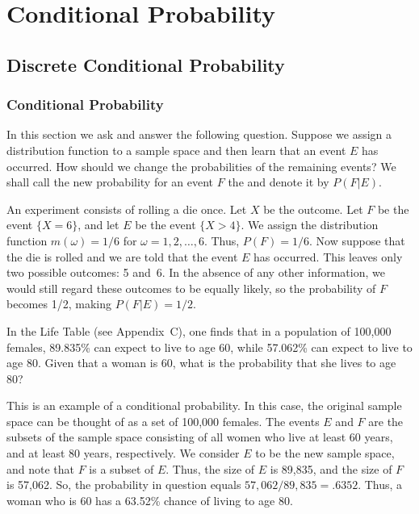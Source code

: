 
\chapter{Conditional Probability}\label{chp 4}  

\section{Discrete Conditional Probability}\label{sec 4.1} 

\subsection*{Conditional Probability}
\par
In this section we ask and answer the following question.  Suppose we assign a
distribution function to a sample space and then learn that an event $E$ has
occurred.  How should we change the probabilities of the remaining events?  We
shall call the new probability for an event $F$ the  and
denote it by
$P(F|E)$.

\begin{example}\label{exam 4.1}
An experiment consists of rolling a die once.  Let $X$ be the outcome.  Let $F$ be the event
$\{X = 6\}$, and  let $E$ be the event $\{X > 4\}$.  We assign the
distribution function
$m(\omega) = 1/6$ for $\omega = 1, 2, \ldots , 6$.  Thus, $P(F) =
1/6$.  Now suppose that the die is rolled and we are told that the event $E$ has occurred.  
This leaves only two possible outcomes: 5 and~6.  In the absence of any other 
information, we would still regard these outcomes to be equally likely, so the 
probability of $F$ becomes 1/2, making $P(F|E) = 1/2$.
\end{example}

\begin{example}\label{exam 4.1.5}
In the Life Table (see Appendix~C), one finds that in a population of 100{,}000 females, 89.835\%
can expect to live to age 60, while 57.062\% can expect to live to age 80.  Given that a woman is
60, what is the probability that she lives to age 80?
\par
This is an example of a conditional probability.  In this case, the original sample space
can be thought of as a set of 100{,}000 females.  The events $E$ and $F$ are the subsets of the
sample space consisting of all women who live at least 60 years, and at least 80 years,
respectively.  We consider $E$ to be the new sample space, and note that $F$ is a subset of $E$. 
Thus, the size of $E$ is 89{,}835, and the size of $F$ is 57{,}062.  So, the probability in
question equals $57{,}062/89{,}835 = .6352$.  Thus, a woman who is 60 has a 63.52\% chance of
living to age 80.
\end{example}


